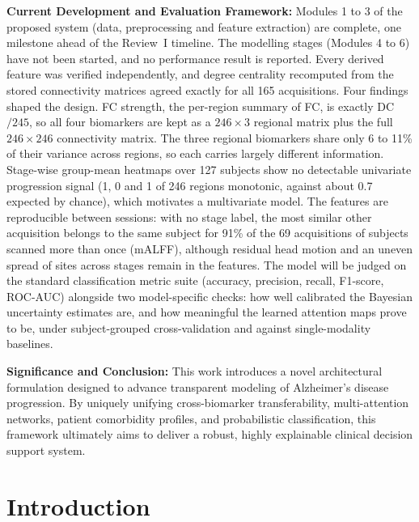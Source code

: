 \documentclass{ssnreview}
\begin{document}
\begin{reviewabstract}
\textbf{Current Development and Evaluation Framework:} Modules 1 to 3 of the proposed system
(data, preprocessing and feature extraction) are complete, one milestone ahead of the
Review~I timeline. The modelling stages (Modules 4 to 6) have not been started, and no
performance result is reported. Every derived feature was verified independently, and
degree centrality recomputed from the stored connectivity matrices agreed exactly for all
165 acquisitions. Four findings shaped the design. FC strength, the per-region summary of FC,
is exactly DC$/245$, so all four biomarkers are kept as a $246\times3$ regional matrix plus
the full $246\times246$ connectivity matrix. The three regional biomarkers share only 6 to
11\% of their variance across regions, so each carries largely different information.
Stage-wise group-mean heatmaps over 127 subjects show no detectable univariate progression
signal (1, 0 and 1 of 246 regions monotonic, against about 0.7 expected by chance), which
motivates a multivariate model. The features are reproducible between sessions: with no stage
label, the most similar other acquisition belongs to the same subject for 91\% of the 69
acquisitions of subjects scanned more than once (mALFF), although residual head motion and an
uneven spread of sites across stages remain in the features. The model will
be judged on the standard classification metric suite (accuracy, precision, recall,
F1-score, ROC-AUC) alongside two model-specific checks: how well calibrated the Bayesian
uncertainty estimates are, and how meaningful the learned attention maps prove to be, under
subject-grouped cross-validation and against single-modality baselines.

\textbf{Significance and Conclusion:} This work introduces a novel architectural formulation
designed to advance transparent modeling of Alzheimer's disease progression. By uniquely
unifying cross-biomarker transferability, multi-attention networks, patient comorbidity
profiles, and probabilistic classification, this framework ultimately aims to deliver a
robust, highly explainable clinical decision support system.

\end{reviewabstract}

\chapter{Introduction}
\end{document}
